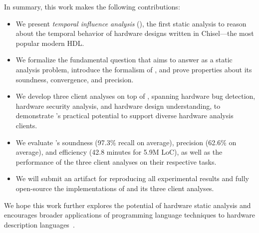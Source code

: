 In summary, this work makes the following contributions:
\begin{itemize}[leftmargin=*]
    \item
    We present \emph{temporal influence analysis} (\tia), the first static analysis to reason about the temporal behavior of hardware designs written in Chisel---the most popular modern HDL.
    \item
    We formalize the fundamental question that \tia aims to answer as a static analysis problem, introduce the formalism of \tia, and prove properties about its soundness, convergence, and precision.
    \item
    We develop three client analyses on top of \tia, spanning hardware bug detection, hardware security analysis, and hardware design understanding, to demonstrate \tia's practical potential to support diverse hardware analysis clients.
    \item
    We evaluate \tia's soundness (97.3\% recall on average), precision (62.6\% on average), and efficiency (42.8 minutes for 5.9M LoC), as well as the performance of the three client analyses on their respective tasks.
    \item
    We will submit an artifact for reproducing all experimental results and fully open-source the implementations of \tia and its three client analyses.
\end{itemize}
We hope this work further explores the potential of hardware static analysis and encourages broader applications of programming language techniques to hardware description languages~\cite{truong_golden_2019}.
